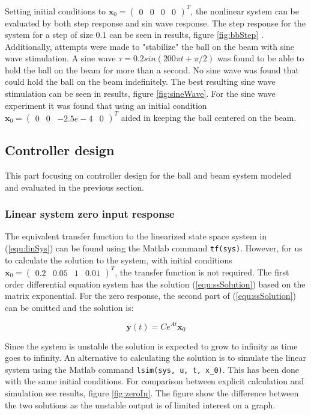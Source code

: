 \documentclass[a4paper, titlepage]{article}
\begin{document}
Setting initial conditions to $\textbf{x}_0 = \begin{pmatrix} 0 & 0 & 0 & 0 \end{pmatrix}^T$, the nonlinear system can be evaluated by both step response and sin wave response.
The step response for the system for a step of size $0.1$ can be seen in results, figure \ref{fig:bbStep}	.
Additionally, attempts were made to "stabilize" the ball on the beam with sine wave stimulation.
A sine wave $\tau = 0.2sin(200\pi t + \pi/2)$ was found to be able to hold the ball on the beam for more than a second.
No sine wave was found that could hold the ball on the beam indefinitely. 
The best resulting sine wave stimulation can be seen in results, figure \ref{fig:sineWave}.
For the sine wave experiment it was found that using an initial condition $\textbf{x}_0 = \begin{pmatrix} 0 & 0 & -2.5e-4 & 0 \end{pmatrix}^T$ aided in keeping the ball centered on the beam.

\subsection{Controller design}
This part focusing on controller design for the ball and beam system modeled and evaluated in the previous section.

\subsubsection{Linear system zero input response}
The equivalent transfer function to the linearized state space system in (\ref{equ:linSys}) can be found using the Matlab command \verb|tf(sys)|.
However, for us to calculate the solution to the system, with initial conditions $\textbf{x}_0 = \begin{pmatrix} 0.2 & 0.05 & 1 & 0.01	 \end{pmatrix}^T$, the transfer function is not required.
The first order differential equation system has the solution (\ref{equ:ssSolution}) based on the matrix exponential.
For the zero response, the second part of (\ref{equ:ssSolution}) can be omitted and the solution is:

\begin{equation}
\textbf{y}(t) = Ce^{At}\textbf{x}_0
\end{equation}

Since the system is unstable the solution is expected to grow to infinity as time goes to infinity.
An alternative to calculating the solution is to simulate the linear system using the Matlab command \verb|lsim(sys, u, t, x_0)|.
This has been done with the same initial conditions.
For comparison between explicit calculation and simulation see results, figure \ref{fig:zeroIn}.
The figure show the difference between the two solutions as the unstable output is of limited interest on a graph.
\end{document}
